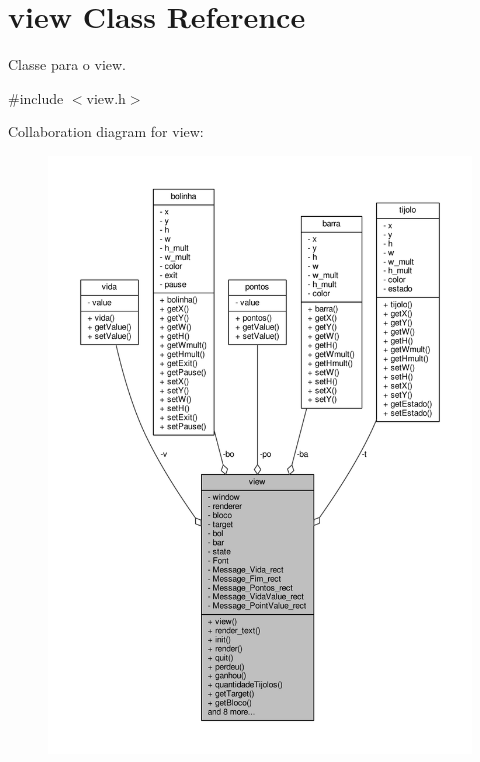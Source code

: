 \hypertarget{classview}{}\section{view Class Reference}
\label{classview}


Classe para o view.  




{\ttfamily \#include $<$view.\+h$>$}



Collaboration diagram for view\+:
\nopagebreak
\begin{figure}[H]
\begin{center}
\leavevmode
\includegraphics[width=350pt]{classview__coll__graph}
\end{center}
\end{figure}
